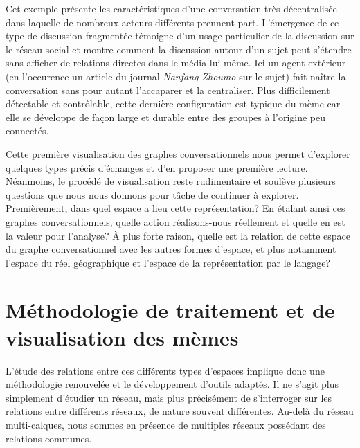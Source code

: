 Cet exemple pr\'esente les caract\'eristiques d{\textquoteright}une
conversation tr\`es d\'ecentralis\'ee dans laquelle de nombreux acteurs
diff\'erents prennent part. L{\textquoteright}\'emergence de ce type de
discussion fragment\'ee t\'emoigne d{\textquoteright}un usage
particulier de la discussion sur le r\'eseau social et montre comment
la discussion autour d{\textquoteright}un sujet peut
s{\textquoteright}\'etendre sans afficher de relations directes dans le
m\'edia lui-m\^eme. Ici un agent ext\'erieur (en
l{\textquoteright}occurence un article du journal \textit{Nanfang
Zhoumo }sur le sujet) fait na\^itre la conversation sans pour autant
l{\textquoteright}accaparer et la centraliser. Plus difficilement
d\'etectable et contr\^olable, cette derni\`ere configuration est
typique du m\`eme car elle se d\'eveloppe de fa\c{c}on large et durable
entre des groupes \`a l{\textquoteright}origine peu connect\'es.

Cette premi\`ere visualisation des graphes conversationnels nous permet
d{\textquoteright}explorer quelques types pr\'ecis
d{\textquoteright}\'echanges et d{\textquoteright}en proposer une
premi\`ere lecture. N\'eanmoins, le proc\'ed\'e de visualisation reste
rudimentaire et soul\`eve plusieurs questions que nous nous donnons
pour t\^ache de continuer \`a explorer. Premi\`erement, dans quel
espace a lieu cette repr\'esentation? En \'etalant ainsi ces graphes
conversationnels, quelle action r\'ealisons-nous r\'eellement et quelle
en est la valeur pour l{\textquoteright}analyse? \`A plus forte raison,
quelle est la relation de cette espace du graphe conversationnel avec
les autres formes d{\textquoteright}espace, et plus notamment
l{\textquoteright}espace du r\'eel g\'eographique et
l{\textquoteright}espace de la repr\'esentation par le langage? 

\section{M\'ethodologie de traitement et de visualisation des m\`emes}
L{\textquoteright}\'etude des relations entre ces diff\'erents types
d{\textquoteright}espaces implique donc une m\'ethodologie renouvel\'ee
et le d\'eveloppement d{\textquoteright}outils adapt\'es. Il ne
s{\textquoteright}agit plus simplement d{\textquoteright}\'etudier un
r\'eseau, mais plus pr\'ecis\'ement de s{\textquoteright}interroger sur
les relations entre diff\'erents r\'eseaux, de nature souvent
diff\'erentes. Au-del\`a du r\'eseau multi-calques, nous sommes en
pr\'esence de multiples r\'eseaux poss\'edant des relations communes.

